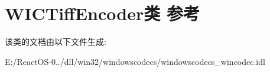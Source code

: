 \hypertarget{class_w_i_c_tiff_encoder}{}\section{W\+I\+C\+Tiff\+Encoder类 参考}
\label{class_w_i_c_tiff_encoder}


该类的文档由以下文件生成\+:\begin{DoxyCompactItemize}
\item 
E\+:/\+React\+O\+S-\/0../dll/win32/windowscodecs/windowscodecs\+\_\+wincodec.\+idl\end{DoxyCompactItemize}
